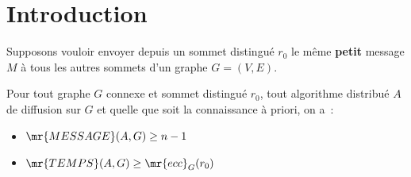 \section{Introduction}
Supposons vouloir envoyer depuis un sommet distingué $r_0$  le même \textbf{petit} message $M$ à tous les autres sommets d'un graphe $G=(V,E)$.


\begin{proposition}{}{}
  Pour tout graphe $G$ connexe et sommet distingué $r_0$, tout algorithme distribué $A$ de diffusion sur $G$ et quelle que soit la connaissance à priori, on a~:
\begin{itemize}
   \item $\mr{MESSAGE}(A,G) \geq n-1$
   \item  $\mr{TEMPS}(A,G) \geq \mr{ecc}_G(r_0)$
\end{itemize}
\end{proposition}
